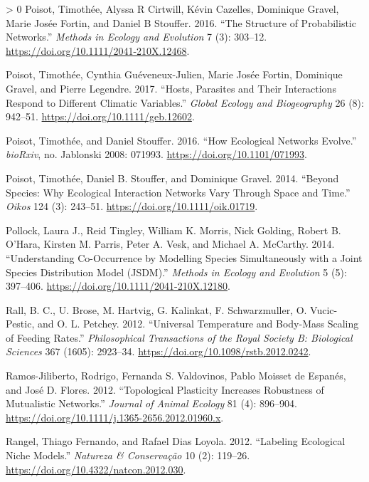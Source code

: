 \documentclass[12pt]{article}
\newlength{\cslhangindent}
\newenvironment{CSLReferences}[3] %
 {%
  \setlength{\parindent}{0pt}
  \ifodd #1 \everypar{\setlength{\hangindent}{\cslhangindent}}\ignorespaces\fi
  \ifnum #2 > 0
  \setlength{\parskip}{#2\baselineskip}
  \fi
 }%
 {}
\begin{document}
\begin{CSLReferences}{1}{0}
\leavevmode\hypertarget{ref-Poisot2016StrPro}{}%
Poisot, Timothée, Alyssa R Cirtwill, Kévin Cazelles, Dominique Gravel,
Marie Josée Fortin, and Daniel B Stouffer. 2016. {``The Structure of
Probabilistic Networks.''} \emph{Methods in Ecology and Evolution} 7
(3): 303--12. \url{https://doi.org/10.1111/2041-210X.12468}.

\leavevmode\hypertarget{ref-Poisot2017HosPar}{}%
Poisot, Timothée, Cynthia Guéveneux-Julien, Marie Josée Fortin,
Dominique Gravel, and Pierre Legendre. 2017. {``Hosts, Parasites and
Their Interactions Respond to Different Climatic Variables.''}
\emph{Global Ecology and Biogeography} 26 (8): 942--51.
\url{https://doi.org/10.1111/geb.12602}.

\leavevmode\hypertarget{ref-Poisot2016HowEco}{}%
Poisot, Timothée, and Daniel Stouffer. 2016. {``How Ecological Networks
Evolve.''} \emph{bioRxiv}, no. Jablonski 2008: 071993.
\url{https://doi.org/10.1101/071993}.

\leavevmode\hypertarget{ref-Poisot2014SpeWhy}{}%
Poisot, Timothée, Daniel B. Stouffer, and Dominique Gravel. 2014.
{``Beyond Species: Why Ecological Interaction Networks Vary Through
Space and Time.''} \emph{Oikos} 124 (3): 243--51.
\url{https://doi.org/10.1111/oik.01719}.

\leavevmode\hypertarget{ref-Pollock2014UndCoo}{}%
Pollock, Laura J., Reid Tingley, William K. Morris, Nick Golding, Robert
B. O'Hara, Kirsten M. Parris, Peter A. Vesk, and Michael A. McCarthy.
2014. {``Understanding Co-Occurrence by Modelling Species Simultaneously
with a Joint Species Distribution Model (JSDM).''} \emph{Methods in
Ecology and Evolution} 5 (5): 397--406.
\url{https://doi.org/10.1111/2041-210X.12180}.

\leavevmode\hypertarget{ref-Rall2012UniTem}{}%
Rall, B. C., U. Brose, M. Hartvig, G. Kalinkat, F. Schwarzmuller, O.
Vucic-Pestic, and O. L. Petchey. 2012. {``Universal Temperature and
Body-Mass Scaling of Feeding Rates.''} \emph{Philosophical Transactions
of the Royal Society B: Biological Sciences} 367 (1605): 2923--34.
\url{https://doi.org/10.1098/rstb.2012.0242}.

\leavevmode\hypertarget{ref-Ramos-Jiliberto2012TopPla}{}%
Ramos-Jiliberto, Rodrigo, Fernanda S. Valdovinos, Pablo Moisset de
Espanés, and José D. Flores. 2012. {``Topological Plasticity Increases
Robustness of Mutualistic Networks.''} \emph{Journal of Animal Ecology}
81 (4): 896--904.
\url{https://doi.org/10.1111/j.1365-2656.2012.01960.x}.

\leavevmode\hypertarget{ref-Rangel2012LabEco}{}%
Rangel, Thiago Fernando, and Rafael Dias Loyola. 2012. {``Labeling
Ecological Niche Models.''} \emph{Natureza \& Conservação} 10 (2):
119--26. \url{https://doi.org/10.4322/natcon.2012.030}.


\end{CSLReferences}
\end{document}
